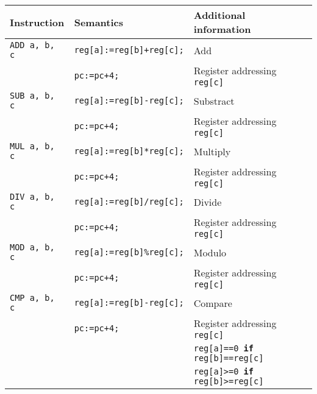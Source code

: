 \par{
    \noindent
    \begin{tabular}{llll}
        \hline
        Instruction 			& Semantics 							& Additional information 								\\
        \hline
        \hline
        \texttt{ADD a, b, c}    &   \texttt{reg[a]:=reg[b]+reg[c];}     &   Add                                                 \\
                                &   \texttt{pc:=pc+4;}                  &   Register addressing \texttt{reg[c]}                 \\
        \texttt{SUB a, b, c}    &   \texttt{reg[a]:=reg[b]-reg[c];}     &   Substract                                           \\
                                &   \texttt{pc:=pc+4;}                  &   Register addressing \texttt{reg[c]}                 \\
        \texttt{MUL a, b, c}    &   \texttt{reg[a]:=reg[b]*reg[c];}     &   Multiply                                            \\
                                &   \texttt{pc:=pc+4;}                  &   Register addressing \texttt{reg[c]}                 \\
        \texttt{DIV a, b, c}    &   \texttt{reg[a]:=reg[b]/reg[c];}     &   Divide                                              \\
                                &   \texttt{pc:=pc+4;}                  &   Register addressing \texttt{reg[c]}                 \\
        \texttt{MOD a, b, c}    &   \texttt{reg[a]:=reg[b]\%reg[c];}    &   Modulo                                              \\
                                &   \texttt{pc:=pc+4;}                  &   Register addressing \texttt{reg[c]}                 \\
        \texttt{CMP a, b, c}    &   \texttt{reg[a]:=reg[b]-reg[c];}     &   Compare                                             \\
                                &   \texttt{pc:=pc+4;}                  &   Register addressing \texttt{reg[c]}                 \\
                                &                                       &   \texttt{reg[a]==0 \textbf{if} reg[b]==reg[c]}       \\
                                &                                       &   \texttt{reg[a]>=0 \textbf{if} reg[b]>=reg[c]}       \\

\end{tabular}}
